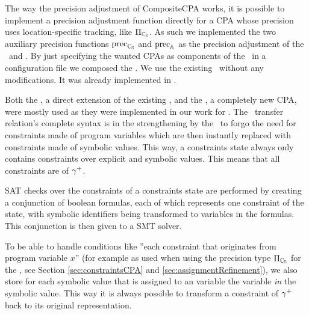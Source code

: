 The way the precision adjustment of CompositeCPA works, it is possible to implement a precision adjustment function directly for a CPA whose precision uses location-specific tracking, like $\Pi_{\mathbb{C_{S}}}$.
As such we implemented the two auxiliary precision functions $\text{prec}_{\mathbb{C_{S}}}$ and $\text{prec}_{\mathbb{A}}$ as the precision adjustment of the \symbolicValueAnalysisCPA\ and \constraintsCPA.
By just specifying the wanted CPAs as components of the \compositeCPA\ in a configuration file we composed the \symbolicExecutionCPA.
We use the existing \locationCPA\ without any modifications. It was already implemented in \cpaChecker.

Both the \symbolicValueAnalysisCPA, a direct extension of the existing ,
and the \constraintsCPA, a completely new CPA, were mostly used as they were implemented in our work for \cite{Lemberger2015}.
The \constraintsCPA\ transfer relation's complete syntax is in the strengthening by the \symbolicValueAnalysisCPA\ to forgo the need for constraints made of program variables which are then instantly replaced with constraints made of symbolic values.
This way, a constraints state always only contains constraints over explicit and symbolic values. This means that all constraints are of ${\gamma^+}$.

SAT checks over the constraints of a constraints state are performed by creating a conjunction of boolean formulas, each of which represents one constraint of the state, with symbolic identifiers being transformed to variables in the formulas. This conjunction is then given to a SMT solver.

To be able to handle conditions like ''each constraint that originates from program variable $x$'' (for example as used when using the precision type $\Pi_{\mathbb{C_{S}}}$ for the \constraintsCPA, see Section \ref{sec:constraintsCPA} and \ref{sec:assignmentRefinement}),
we also store for each symbolic value that is assigned to an variable the variable \emph{in} the symbolic value.
This way it is always possible to transform a constraint of ${\gamma^+}$ back to its original representation.